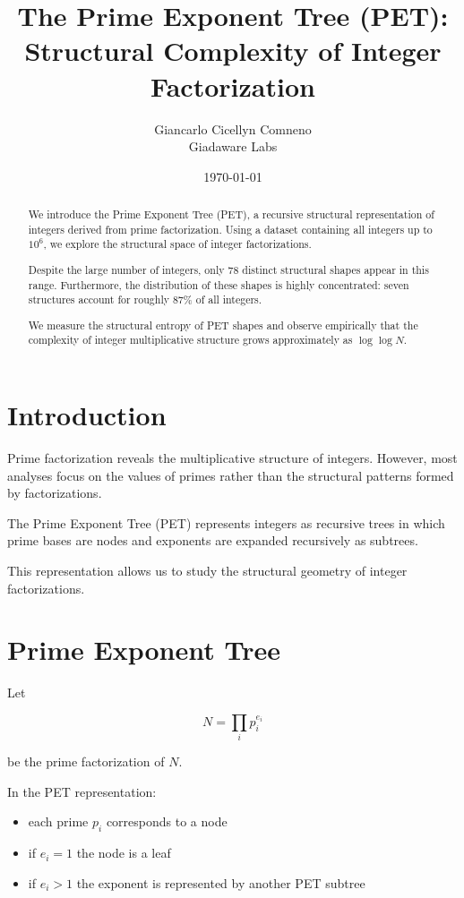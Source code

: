 \documentclass[11pt]{article}
\title{The Prime Exponent Tree (PET): \\
Structural Complexity of Integer Factorization}
\author{Giancarlo Cicellyn Comneno \\
Giadaware Labs}
\date{\today}
\begin{document}
\maketitle

\begin{abstract}
We introduce the Prime Exponent Tree (PET), a recursive structural representation
of integers derived from prime factorization. Using a dataset containing all
integers up to $10^6$, we explore the structural space of integer factorizations.

Despite the large number of integers, only 78 distinct structural shapes appear
in this range. Furthermore, the distribution of these shapes is highly
concentrated: seven structures account for roughly 87\% of all integers.

We measure the structural entropy of PET shapes and observe empirically that
the complexity of integer multiplicative structure grows approximately as
$\log\log N$.
\end{abstract}

\section{Introduction}

Prime factorization reveals the multiplicative structure of integers.
However, most analyses focus on the values of primes rather than the
structural patterns formed by factorizations.

The Prime Exponent Tree (PET) represents integers as recursive trees in
which prime bases are nodes and exponents are expanded recursively as
subtrees.

This representation allows us to study the structural geometry of
integer factorizations.

\section{Prime Exponent Tree}

Let

\begin{equation}
N = \prod_i p_i^{e_i}
\end{equation}

be the prime factorization of $N$.

In the PET representation:

\begin{itemize}
\item each prime $p_i$ corresponds to a node
\item if $e_i = 1$ the node is a leaf
\item if $e_i > 1$ the exponent is represented by another PET subtree
\end{itemize}
\end{document}
